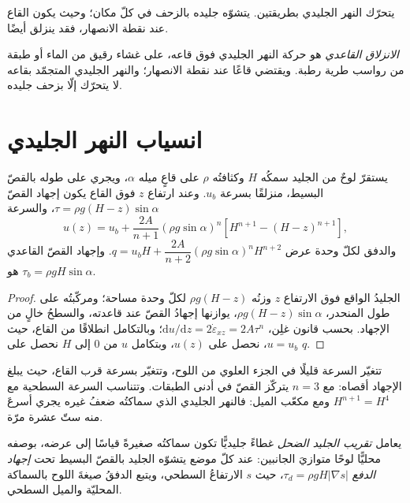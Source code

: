 يتحرّك النهر الجليدي بطريقتين. يتشوّه جليده بالزحف في كلّ مكان؛ وحيث
يكون القاع عند نقطة الانصهار، فقد ينزلق أيضًا.

\begin{definition}\label{def:b3:glaciology:sliding}
\emph{الانزلاق القاعدي} هو حركة النهر الجليدي فوق
قاعه، على غشاء رقيق من الماء أو طبقة من رواسب طرية رطبة. ويقتضي
قاعًا عند نقطة الانصهار؛ والنهر الجليدي المتجمّد بقاعه لا يتحرّك
إلّا بزحف جليده.
\end{definition}

\section{انسياب النهر الجليدي}\label{sec:b3:glaciology:flow}

\begin{theorem}\label{thm:b3:glaciology:slab}
يستقرّ لوحٌ من الجليد سمكُه $H$ وكثافتُه $\rho$ على قاعٍ ميله
$\alpha$، ويجري على طوله بالقصّ البسيط، منزلقًا بسرعة $u_b$. وعند
ارتفاع $z$ فوق القاع يكون إجهاد القصّ $\tau = \rho g(H - z)\sin\alpha$،
والسرعة
\[
u(z) = u_b + \frac{2A}{n + 1}(\rho g\sin\alpha)^n\left[H^{n+1} - (H -
z)^{n+1}\right],
\]
والدفق لكلّ وحدة عرض $q = u_bH + \dfrac{2A}{n + 2}(\rho
g\sin\alpha)^nH^{n+2}$. وإجهاد القصّ القاعدي هو $\tau_b = \rho gH\sin\alpha$.
\end{theorem}

\begin{proof}
الجليدُ الواقع فوق الارتفاع $z$ وزنُه $\rho g(H - z)$ لكلّ وحدة مساحة؛ ومركّبتُه
على طول المنحدر، $\rho g(H - z)\sin\alpha$، يوازنها إجهادُ القصّ عند قاعدته، والسطحُ خالٍ من الإجهاد.
بحسب قانون غلِن،
$\mathrm du/\mathrm dz = 2\dot\varepsilon_{xz} = 2A\tau^n$؛ وبالتكامل انطلاقًا
من القاع، حيث $u = u_b$، نحصل على $u(z)$، وبتكامل $u$ من 0 إلى $H$
نحصل على $q$.
\end{proof}

تتغيّر السرعة قليلًا في الجزء العلوي من اللوح، وتتغيّر بسرعة قرب
القاع، حيث يبلغ الإجهاد أقصاه: مع $n = 3$ يتركّز القصّ في
أدنى الطبقات. وتتناسب السرعة السطحية مع $H^{n+1} = H^4$ ومع مكعّب
الميل: فالنهر الجليدي الذي سماكتُه ضعفُ غيره يجري أسرعَ منه ستّ عشرة مرّة.

\begin{definition}\label{def:b3:glaciology:sia}
يعامل \emph{تقريب الجليد الضحل} غطاءً جليديًّا
تكون سماكتُه صغيرةً قياسًا إلى عرضه، بوصفه محليًّا
لوحًا متوازيَ الجانبين: عند كلّ موضع يتشوّه الجليد بالقصّ البسيط تحت
\emph{إجهاد الدفع} $\tau_d = \rho gH|\nabla s|$، حيث $s$
الارتفاعُ السطحي، ويتبع الدفقُ صيغةَ اللوح بالسماكة المحليّة
والميل السطحي.
\end{definition}

